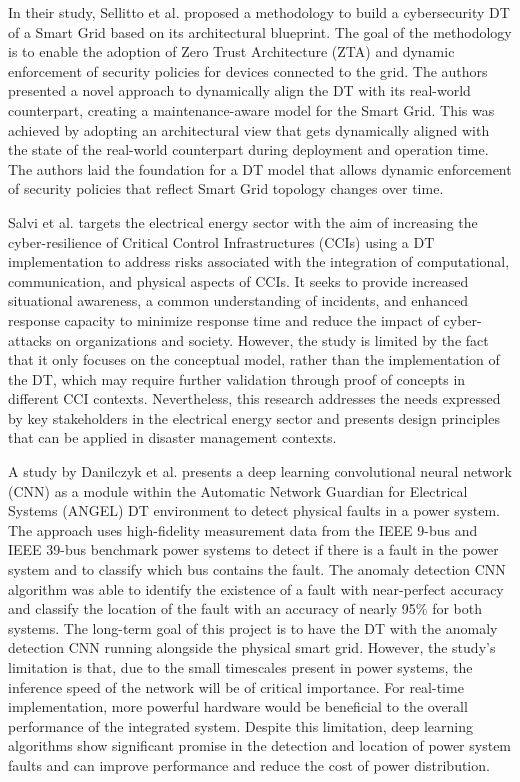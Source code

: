 In their study, Sellitto et al.\cite{giovannipaolosellittoEnablingZeroTrust2021} proposed a methodology to build a cybersecurity DT of a Smart Grid based on its architectural blueprint. The goal of the methodology is to enable the adoption of Zero Trust Architecture (ZTA) and dynamic enforcement of security policies for devices connected to the grid. The authors presented a novel approach to dynamically align the DT with its real-world counterpart, creating a maintenance-aware model for the Smart Grid. This was achieved by adopting an architectural view that gets dynamically aligned with the state of the real-world counterpart during deployment and operation time. The authors laid the foundation for a DT model that allows dynamic enforcement of security policies that reflect Smart Grid topology changes over time. 


Salvi et al.\cite{salviCyberresilienceCriticalCyber2022} targets the electrical energy sector with the aim of increasing the cyber-resilience of Critical Control Infrastructures (CCIs) using a DT implementation to address risks associated with the integration of computational, communication, and physical aspects of CCIs. It seeks to provide increased situational awareness, a common understanding of incidents, and enhanced response capacity to minimize response time and reduce the impact of cyber-attacks on organizations and society. However, the study is limited by the fact that it only focuses on the conceptual model, rather than the implementation of the DT, which may require further validation through proof of concepts in different CCI contexts. Nevertheless, this research addresses the needs expressed by key stakeholders in the electrical energy sector and presents design principles that can be applied in disaster management contexts.


A study by Danilczyk et al.\cite{danilczykSmartGridAnomaly2021} presents a deep learning convolutional neural network (CNN) as a module within the Automatic Network Guardian for Electrical Systems (ANGEL) DT environment to detect physical faults in a power system. The approach uses high-fidelity measurement data from the IEEE 9-bus and IEEE 39-bus benchmark power systems to detect if there is a fault in the power system and to classify which bus contains the fault. The anomaly detection CNN algorithm was able to identify the existence of a fault with near-perfect accuracy and classify the location of the fault with an accuracy of nearly 95\% for both systems. The long-term goal of this project is to have the DT with the anomaly detection CNN running alongside the physical smart grid. However, the study's limitation is that, due to the small timescales present in power systems, the inference speed of the network will be of critical importance. For real-time implementation, more powerful hardware would be beneficial to the overall performance of the integrated system. Despite this limitation, deep learning algorithms show significant promise in the detection and location of power system faults and can improve performance and reduce the cost of power distribution.

